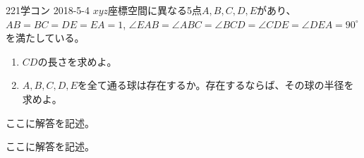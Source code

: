 \begin{prob}{221}{}{学コン 2018-5-4}
 $xyz$座標空間に異なる5点$A, B, C, D, E$があり、$AB=BC=DE=EA=1$, $\angle{EAB}=\angle{ABC}=\angle{BCD}=\angle{CDE}=\angle{DEA}=90^\circ$ を満たしている。
 \begin{enumerate}
  \item $CD$の長さを求めよ。
  \item $A, B, C, D, E$を全て通る球は存在するか。存在するならば、その球の半径を求めよ。
 \end{enumerate}
\end{prob}
ここに解答を記述。

ここに解答を記述。